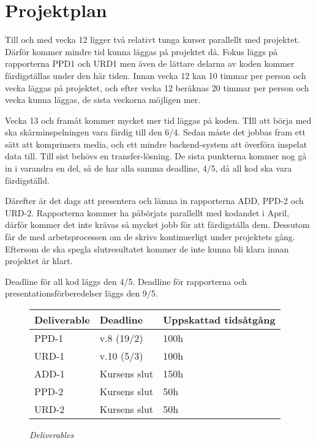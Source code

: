 
\section{Projektplan}
\label{sec:projektplan}
Till och med vecka 12 ligger två relativt tunga kurser parallellt med projektet. Därför kommer mindre tid kunna läggas på projektet då. Fokus läggs på rapporterna PPD1 och URD1 men även de lättare delarna av koden kommer färdigställas under den här tiden. Innan vecka 12 kan 10 timmar per person och vecka läggas på projektet, och efter vecka 12 beräknas 20 timmar per person och vecka kunna läggas, de sista veckorna möjligen mer.

Vecka 13 och framåt kommer mycket mer tid läggas på koden. TIll att börja med ska skärminspelningen vara färdig till den 6/4. Sedan måste det jobbas fram ett sätt att komprimera media, och ett mindre backend-system att överföra inspelat data till. Till sist behövs en transfer-lösning. De sista punkterna kommer nog gå in i varandra en del, så de har alla samma deadline, 4/5, då all kod ska vara färdigställd. 

Därefter är det dags att presentera och lämna in rapporterna ADD, PPD-2 och URD-2. Rapporterna kommer ha påbörjats parallellt med kodandet i April, därför kommer det inte krävas så mycket jobb för att färdigställa dem. Dessutom får de med arbetsprocessen om de skrivs kontinuerligt under projektets gång. Eftersom de ska spegla slutresultatet kommer de inte kunna bli klara innan projektet är klart. 

Deadline för all kod läggs den 4/5. Deadline för rapporterna och presentationsförberedelser läggs den 9/5. 

\begin{figure}[H]
\centering
\begin{tabular}{ | l | l | l |}
  \hline
  \textbf{Deliverable} & \textbf{Deadline} & \textbf{Uppskattad tidsåtgång} \\ \hline
  PPD-1 & v.8 (19/2) & 100h \\ \hline
  URD-1 & v.10 (5/3) & 100h \\ \hline
  ADD-1 & Kursens slut & 150h \\ \hline
  PPD-2 & Kursens slut & 50h \\ \hline
  URD-2 & Kursens slut & 50h \\ \hline
\end{tabular}
\caption*{\textit{Deliverables}}
\end{figure}

